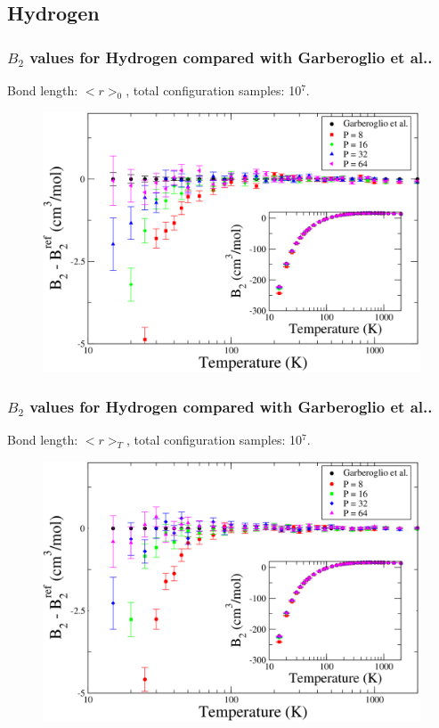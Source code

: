 \documentclass[xcolor=svgnames]{beamer}
\begin{document}
        \subsection{Hydrogen}
            \begin{frame}
                \frametitle{$B_2$ values for Hydrogen compared with Garberoglio et al..}
                \begin{center}Bond length: $< r >_0$, total configuration samples: 10$^7$.\end{center}
                \begin{figure}
                    \centering
                    \includegraphics[scale=0.18,keepaspectratio]{s1GarberoglioAll.png}
                \end{figure}
            \end{frame}
            \begin{frame}
                \frametitle{$B_2$ values for Hydrogen compared with Garberoglio et al..}
                \begin{center}Bond length: $< r >_T$, total configuration samples: 10$^7$.\end{center}
                \begin{figure}
                    \centering
                    \includegraphics[scale=0.18,keepaspectratio]{s2GarberoglioAll.png}
                \end{figure}
            \end{frame}
\end{document}
